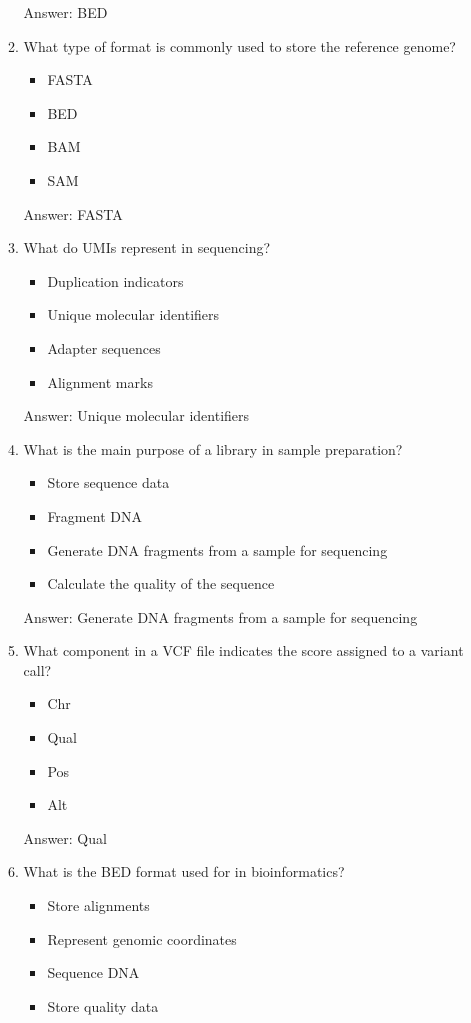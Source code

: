 \begin{itemize}
\begin{enumerate}
Answer: BED

\item What type of format is commonly used to store the reference genome?
\begin{itemize}
\item FASTA
\item BED
\item BAM
\item SAM
\end{itemize}

Answer: FASTA

\item What do UMIs represent in sequencing?
\begin{itemize}
\item Duplication indicators
\item Unique molecular identifiers
\item Adapter sequences
\item Alignment marks
\end{itemize}

Answer: Unique molecular identifiers

\item What is the main purpose of a library in sample preparation?
\begin{itemize}
\item Store sequence data
\item Fragment DNA
\item Generate DNA fragments from a sample for sequencing
\item Calculate the quality of the sequence
\end{itemize}

Answer: Generate DNA fragments from a sample for sequencing

\item What component in a VCF file indicates the score assigned to a variant call?
\begin{itemize}
\item Chr
\item Qual
\item Pos
\item Alt
\end{itemize}

Answer: Qual

\item What is the BED format used for in bioinformatics?
\begin{itemize}
\item Store alignments
\item Represent genomic coordinates
\item Sequence DNA
\item Store quality data
\end{itemize}


\end{enumerate}
\end{itemize}

